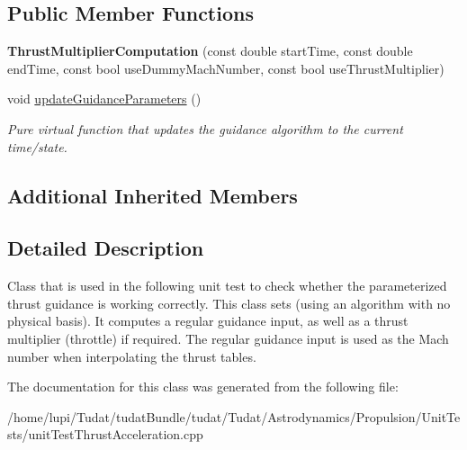 \subsection*{Public Member Functions}
\begin{DoxyCompactItemize}
\item 
{\bfseries Thrust\+Multiplier\+Computation} (const double start\+Time, const double end\+Time, const bool use\+Dummy\+Mach\+Number, const bool use\+Thrust\+Multiplier)\hypertarget{classtudat_1_1unit__tests_1_1ThrustMultiplierComputation_ab70977e9f9a91797c5dfc71f088c24bf}{}\label{classtudat_1_1unit__tests_1_1ThrustMultiplierComputation_ab70977e9f9a91797c5dfc71f088c24bf}

\item 
void \hyperlink{classtudat_1_1unit__tests_1_1ThrustMultiplierComputation_a8e6a873d15c8acff61cc0130d37cca65}{update\+Guidance\+Parameters} ()\hypertarget{classtudat_1_1unit__tests_1_1ThrustMultiplierComputation_a8e6a873d15c8acff61cc0130d37cca65}{}\label{classtudat_1_1unit__tests_1_1ThrustMultiplierComputation_a8e6a873d15c8acff61cc0130d37cca65}

\begin{DoxyCompactList}\small\item\em Pure virtual function that updates the guidance algorithm to the current time/state. \end{DoxyCompactList}\end{DoxyCompactItemize}
\subsection*{Additional Inherited Members}


\subsection{Detailed Description}
Class that is used in the following unit test to check whether the parameterized thrust guidance is working correctly. This class sets (using an algorithm with no physical basis). It computes a \textquotesingle{}regular\textquotesingle{} guidance input, as well as a thrust multiplier (throttle) if required. The regular guidance input is used as the Mach number when interpolating the thrust tables. 

The documentation for this class was generated from the following file\+:\begin{DoxyCompactItemize}
\item 
/home/lupi/\+Tudat/tudat\+Bundle/tudat/\+Tudat/\+Astrodynamics/\+Propulsion/\+Unit\+Tests/unit\+Test\+Thrust\+Acceleration.\+cpp\end{DoxyCompactItemize}

